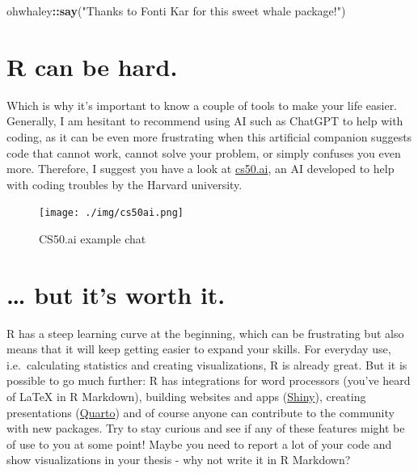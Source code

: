 \documentclass[
]{book}
\newenvironment{Shaded}{\begin{snugshade}}{\end{snugshade}}
\newcommand{\FunctionTok}[1]{\textcolor[rgb]{0.13,0.29,0.53}{\textbf{#1}}}
\newcommand{\NormalTok}[1]{#1}
\newcommand{\SpecialCharTok}[1]{\textcolor[rgb]{0.81,0.36,0.00}{\textbf{#1}}}
\newcommand{\StringTok}[1]{\textcolor[rgb]{0.31,0.60,0.02}{#1}}
\begin{document}
\begin{Shaded}
\begin{Highlighting}[]
\NormalTok{ohwhaley}\SpecialCharTok{::}\FunctionTok{say}\NormalTok{(}\StringTok{"Thanks to Fonti Kar for this sweet whale package!"}\NormalTok{)}
\end{Highlighting}
\end{Shaded}

\section*{R can be hard.}\label{r-can-be-hard.}

Which is why it's important to know a couple of tools to make your life easier.
Generally, I am hesitant to recommend using AI such as ChatGPT to help with coding, as it can be even more frustrating when this artificial companion suggests code that cannot work, cannot solve your problem, or simply confuses you even more.
Therefore, I suggest you have a look at \url{cs50.ai}, an AI developed to help with coding troubles by the Harvard university.

\begin{figure}
\centering
\texttt{[image: ./img/cs50ai.png]}
\caption{CS50.ai example chat}
\end{figure}

\section*{\ldots{} but it's worth it.}\label{but-its-worth-it.}

R has a steep learning curve at the beginning, which can be frustrating but also means that it will keep getting easier to expand your skills.
For everyday use, i.e.~calculating statistics and creating visualizations, R is already great.
But it is possible to go much further: R has integrations for word processors (you've heard of LaTeX in R Markdown), building websites and apps (\href{https://shiny.posit.co/r/getstarted/shiny-basics/lesson1/index.html}{Shiny}), creating presentations (\href{https://quarto.org/docs/get-started/hello/rstudio.html}{Quarto}) and of course anyone can contribute to the community with new packages.
Try to stay curious and see if any of these features might be of use to you at some point!
Maybe you need to report a lot of your code and show visualizations in your thesis - why not write it in R Markdown?
\end{document}
